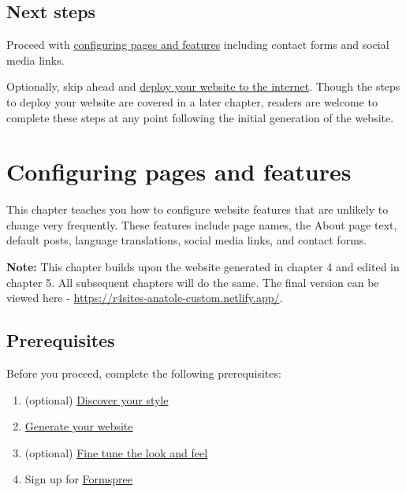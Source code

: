 \documentclass[
]{book}
\providecommand{\tightlist}{%
  \setlength{\itemsep}{0pt}\setlength{\parskip}{0pt}}
\begin{document}
\hypertarget{next-steps-3}{%
\section{Next steps}\label{next-steps-3}}

Proceed with \protect\hyperlink{pages-features}{configuring pages and features} including contact forms and social media links.

Optionally, skip ahead and \protect\hyperlink{deploy}{deploy your website to the internet}. Though the steps to deploy your website are covered in a later chapter, readers are welcome to complete these steps at any point following the initial generation of the website.

\hypertarget{pages-features}{%
\chapter{Configuring pages and features}\label{pages-features}}

This chapter teaches you how to configure website features that are unlikely to change very frequently. These features include page names, the About page text, default posts, language translations, social media links, and contact forms.

\textbf{Note:} This chapter builds upon the website generated in chapter 4 and edited in chapter 5. All subsequent chapters will do the same. The final version can be viewed here - \url{https://r4sites-anatole-custom.netlify.app/}.

\hypertarget{prerequisites-2}{%
\section{Prerequisites}\label{prerequisites-2}}

Before you proceed, complete the following prerequisites:

\begin{enumerate}
\def\labelenumi{\arabic{enumi}.}
\tightlist
\item
  (optional) \protect\hyperlink{choose-theme}{Discover your style}
\item
  \protect\hyperlink{generate}{Generate your website}
\item
  (optional) \protect\hyperlink{fine-tune}{Fine tune the look and feel}
\item
  Sign up for \href{https://formspree.io}{Formspree}
\end{enumerate}
\end{document}
